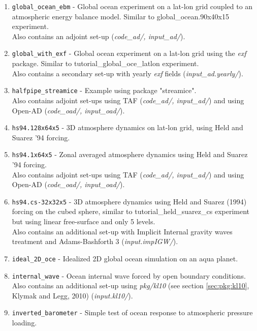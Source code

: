 \begin{enumerate}
\item \texttt{global\_ocean\_ebm} - Global ocean experiment on a lat-lon
  grid coupled to an atmospheric energy balance model. Similar to
  global\_ocean.90x40x15 experiment.\\
  Also contains an adjoint set-up ({\it code\_ad/, input\_ad/}).

\item \texttt{global\_with\_exf} - Global ocean experiment on a lat-lon
  grid using the {\it exf} package. Similar to tutorial\_global\_oce\_latlon
  experiment.\\
  Also contains a secondary set-up with yearly {\it exf} fields ({\it input\_ad.yearly/}).

\item \texttt{halfpipe\_streamice} - Example using package "streamice".\\
  Also contains adjoint set-ups using TAF ({\it code\_ad/, input\_ad/})
   and using Open-AD ({\it code\_oad/, input\_oad/}).

\item \texttt{hs94.128x64x5} - 3D atmosphere dynamics on lat-lon grid,
  using Held and Suarez '94 forcing.

\item \texttt{hs94.1x64x5} - Zonal averaged atmosphere dynamics
  using Held and Suarez '94 forcing.\\
  Also contains adjoint set-ups using TAF ({\it code\_ad/, input\_ad/})
   and using Open-AD ({\it code\_oad/, input\_oad/}).

\item \texttt{hs94.cs-32x32x5} - 3D atmosphere dynamics using Held and
  Suarez (1994) forcing on the cubed sphere, similar to tutorial\_held\_suarez\_cs
  experiment but using linear free-surface and only 5 levels.\\
  Also contains an additional set-up with Implicit Internal gravity waves
  treatment and Adams-Bashforth 3 ({\it input.impIGW/}).

\item \texttt{ideal\_2D\_oce} - Idealized 2D global ocean simulation on
  an aqua planet.

\item \texttt{internal\_wave} - Ocean internal wave forced by open
  boundary conditions.\\
  Also contains an additional set-up using {\it pkg/kl10} (see section
   \ref{sec:pkg:kl10}, Klymak and Legg, 2010) ({\it input.kl10/}).

\item \texttt{inverted\_barometer} - Simple test of ocean response to
  atmospheric pressure loading.


\end{enumerate}
